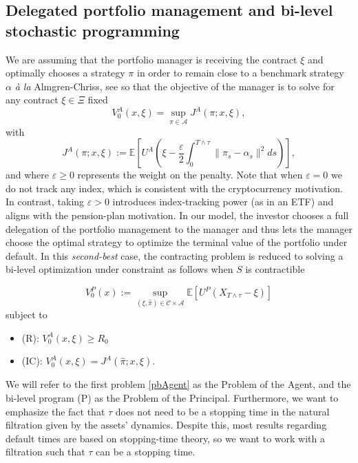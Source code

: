 \documentclass[11pt,a4paper]{article}
\theoremstyle{thmstyleone}%
\theoremstyle{thmstyletwo}%
\theoremstyle{thmstylethree}%
\newcommand{\T}{T \wedge \tau}
\begin{document}
\subsection{Delegated portfolio management and bi-level stochastic programming}\label{subseciton:delegatedmanagement}
We are assuming that the portfolio manager is receiving the contract $\xi$ and optimally chooses a strategy $\pi$ in order to remain close to a benchmark strategy $\alpha$ \textit{\`a la} Almgren-Chriss, see \cite{almgren2001optimal} so that the objective of the manager is to solve for any contract $\xi\in \Xi$ fixed
\begin{equation}\label{pbAgent}  \tag{A} V^A_0(x,\xi)=\sup_{\pi\in \mathcal A} J^A(\pi;x,\xi),\end{equation}
with
\[J^A(\pi;x,\xi):=\mathbb E[ U^A(\xi-\frac{\varepsilon}2 \int_{0}^{\T} \|\pi_s - \alpha_s\|^2 ds)],\]
and where $\varepsilon\geq 0$ represents the weight on the penalty. Note that when $\varepsilon=0$ we do not track any index, which is consistent with the cryptocurrency motivation. In contrast, taking $\varepsilon>0$ introduces index-tracking power (as in an ETF) and aligns with the pension-plan motivation. In our model, the investor chooses a full delegation of the portfolio management to the manager and thus lets the manager choose the optimal strategy to optimize the terminal value of the portfolio under default. In this \textit{second-best} case, the contracting problem is reduced to solving a bi-level optimization under constraint as follows when $S$ is contractible

\begin{equation}    \label{eq:principalPb}
    \tag{P}
     V_0^P(x) := \sup_{(\xi,\hat\pi) \in \mathcal C\times \mathcal{A}} \mathbb{E}[U^P(X_{T\wedge \tau}-\xi)]
\end{equation}
subject to
\begin{itemize}
    \item (R):\; $V_0^A(x,\xi)\geq R_0$
    \item (IC):\; $V_0^A(x,\xi) = J^A(\hat\pi;x,\xi)$.
\end{itemize}


We will refer to the first problem \eqref{pbAgent} as the Problem of the Agent, and the bi-level program (P) as the Problem of the Principal. 
Furthermore, we want to emphasize the fact that $\tau$ does not need to be a stopping time in the natural filtration given by the assets' dynamics. Despite this, most results regarding default times are based on stopping-time theory, so we want to work with a filtration such that $\tau$ can be a stopping time.
\end{document}
